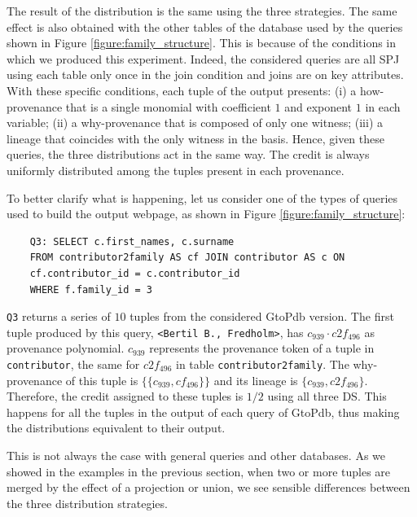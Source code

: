 The result of the distribution is the same using the three strategies. The same effect is also obtained with the other tables of the database used by the queries shown in Figure \ref{figure:family_structure}. 
This is because of the conditions in which we produced this experiment. Indeed, the considered queries are all SPJ using each table only once in the join condition and joins are on key attributes. 
With these specific conditions, each tuple of the output presents: (i) a how-provenance that is a single monomial with coefficient $1$ and exponent $1$ in each variable; (ii) a why-provenance that is composed of only one witness; (iii) a lineage that coincides with the only witness in the basis.
Hence, given these queries, the three distributions act in the same way.
The credit is always uniformly distributed among the tuples present in each provenance. 

To better clarify what is happening, let us consider one of the types of queries used to build the output webpage, as shown in Figure \ref{figure:family_structure}:

\vspace{2mm}
{\footnotesize
\begin{adjustwidth}{25pt}{5pt}
	\begin{verbatim}
	Q3: SELECT c.first_names, c.surname
	FROM contributor2family AS cf JOIN contributor AS c ON 
	cf.contributor_id = c.contributor_id 
	WHERE f.family_id = 3
\end{verbatim}
\end{adjustwidth}
}
\vspace{2mm}

\texttt{Q3} returns a series of $10$ tuples from the considered GtoPdb version. 
The first tuple produced by this query, \texttt{<Bertil B., Fredholm>}, has $c_{939} \cdot c2f_{496}$ as provenance polynomial.
$c_{939}$ represents the provenance token of a tuple in \texttt{contributor}, the same for $c2f_{496}$ in table \texttt{contributor2family}. 
The why-provenance of this tuple is $\{\{c_{939}, cf_{496} \}\}$ and its lineage is $\{c_{939}, c2f_{496} \}$.
Therefore, the credit assigned to these tuples is $1/2$ using all three DS.
This happens for all the tuples in the output of each query of GtoPdb, thus making the distributions equivalent to their output.

This is not always the case with general queries and other databases. As we showed in the examples in the previous section, when two or more tuples are merged by the effect of a projection or union, we see sensible differences between the three distribution strategies. %


